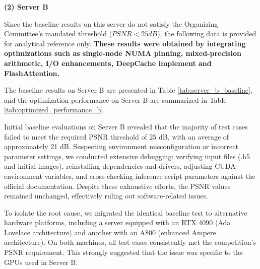 


\textbf{(2) Server B}

Since the baseline results on this server do not satisfy the Organizing Committee's mandated threshold ($PSNR < 25 dB$), the following data is provided for analytical reference only. 
\textbf{These results were obtained by integrating optimizations such as single-node NUMA pinning, mixed-precision arithmetic, I/O enhancements, DeepCache implement and FlashAttention.}

The baseline results on Server B are presented in Table \ref{tab:server_b_baseline}, and the optimization performance on Server B are summarized in Table \ref{tab:optimized_performance_b}.

Initial baseline evaluations on Server B revealed that the majority of test cases failed to meet the required PSNR threshold of 25 dB, with an average of approximately 21 dB. 
Suspecting environment misconfiguration or incorrect parameter settings, we conducted extensive debugging: verifying input files (.h5 and initial images), reinstalling dependencies and drivers, adjusting CUDA environment variables, and cross-checking inference script parameters against the official documentation. Despite these exhaustive efforts, the PSNR values remained unchanged, effectively ruling out software-related issues.

To isolate the root cause, we migrated the identical baseline test to alternative hardware platforms, including a server equipped with an RTX 4090 (Ada Lovelace architecture) and another with an A800 (enhanced Ampere architecture). On both machines, all test cases consistently met the competition's PSNR requirement. This strongly suggested that the issue was specific to the GPUs used in Server B.


